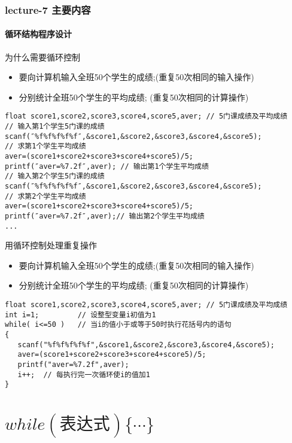 \begin{frame}[shrink]
  \frametitle{lecture-7 主要内容}
  \framesubtitle{循环结构程序设计}
  \tableofcontents[hideallsubsections]
\end{frame}

\begin{frame}{为什么需要循环控制}
\begin{itemize}
	\item 要向计算机输入全班50个学生的成绩;(重复50次相同的输入操作)
	\item 分别统计全班50个学生的平均成绩;	(重复50次相同的计算操作)
\end{itemize}
\begin{lstlisting}
float score1,score2,score3,score4,score5,aver; // 5门课成绩及平均成绩
// 输入第1个学生5门课的成绩
scanf(″%f%f%f%f%f″,&score1,&score2,&score3,&score4,&score5);
// 求第1个学生平均成绩
aver=(score1+score2+score3+score4+score5)/5;
printf(″aver=%7.2f″,aver); // 输出第1个学生平均成绩
// 输入第2个学生5门课的成绩
scanf(″%f%f%f%f%f″,&score1,&score2,&score3,&score4,&score5);
// 求第2个学生平均成绩
aver=(score1+score2+score3+score4+score5)/5;
printf(″aver=%7.2f″,aver);// 输出第2个学生平均成绩
...
\end{lstlisting}
\end{frame}

\begin{frame}{用循环控制处理重复操作}
\begin{itemize}
	\item 要向计算机输入全班50个学生的成绩;(重复50次相同的输入操作)
	\item 分别统计全班50个学生的平均成绩;	(重复50次相同的计算操作)
\end{itemize}
\begin{lstlisting}
float score1,score2,score3,score4,score5,aver; // 5门课成绩及平均成绩
int i=1;         // 设整型变量i初值为1   
while( i<=50 )   // 当i的值小于或等于50时执行花括号内的语句
{
   scanf("%f%f%f%f%f",&score1,&score2,&score3,&score4,&score5);
   aver=(score1+score2+score3+score4+score5)/5; 
   printf("aver=%7.2f",aver);
   i++;  // 每执行完一次循环使i的值加1 
}   
\end{lstlisting}
\end{frame}

\section{$while(\text{表达式})\{ \cdots\}$}

